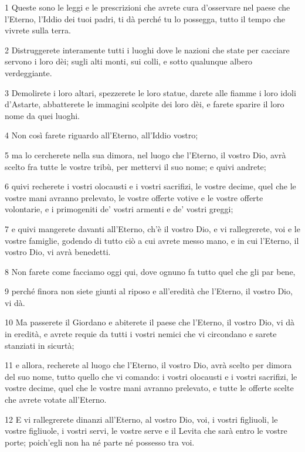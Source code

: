 \par 1 Queste sono le leggi e le prescrizioni che avrete cura d'osservare nel paese che l'Eterno, l'Iddio dei tuoi padri, ti dà perché tu lo possegga, tutto il tempo che vivrete sulla terra.
\par 2 Distruggerete interamente tutti i luoghi dove le nazioni che state per cacciare servono i loro dèi; sugli alti monti, sui colli, e sotto qualunque albero verdeggiante.
\par 3 Demolirete i loro altari, spezzerete le loro statue, darete alle fiamme i loro idoli d'Astarte, abbatterete le immagini scolpite dei loro dèi, e farete sparire il loro nome da quei luoghi.
\par 4 Non così farete riguardo all'Eterno, all'Iddio vostro;
\par 5 ma lo cercherete nella sua dimora, nel luogo che l'Eterno, il vostro Dio, avrà scelto fra tutte le vostre tribù, per mettervi il suo nome; e quivi andrete;
\par 6 quivi recherete i vostri olocausti e i vostri sacrifizi, le vostre decime, quel che le vostre mani avranno prelevato, le vostre offerte votive e le vostre offerte volontarie, e i primogeniti de' vostri armenti e de' vostri greggi;
\par 7 e quivi mangerete davanti all'Eterno, ch'è il vostro Dio, e vi rallegrerete, voi e le vostre famiglie, godendo di tutto ciò a cui avrete messo mano, e in cui l'Eterno, il vostro Dio, vi avrà benedetti.
\par 8 Non farete come facciamo oggi qui, dove ognuno fa tutto quel che gli par bene,
\par 9 perché finora non siete giunti al riposo e all'eredità che l'Eterno, il vostro Dio, vi dà.
\par 10 Ma passerete il Giordano e abiterete il paese che l'Eterno, il vostro Dio, vi dà in eredità, e avrete requie da tutti i vostri nemici che vi circondano e sarete stanziati in sicurtà;
\par 11 e allora, recherete al luogo che l'Eterno, il vostro Dio, avrà scelto per dimora del suo nome, tutto quello che vi comando: i vostri olocausti e i vostri sacrifizi, le vostre decime, quel che le vostre mani avranno prelevato, e tutte le offerte scelte che avrete votate all'Eterno.
\par 12 E vi rallegrerete dinanzi all'Eterno, al vostro Dio, voi, i vostri figliuoli, le vostre figliuole, i vostri servi, le vostre serve e il Levita che sarà entro le vostre porte; poich'egli non ha né parte né possesso tra voi.
